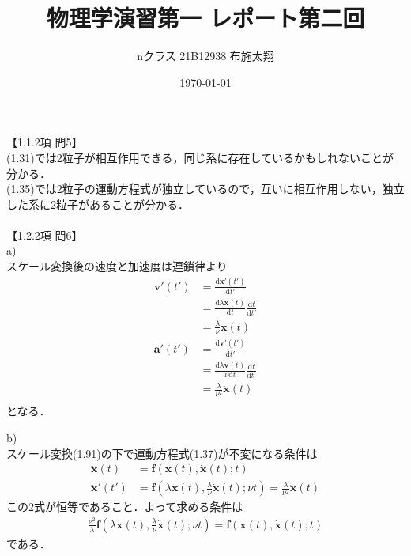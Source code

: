 \documentclass[a4paper,11pt]{jsarticle}
\begin{document}
\title{物理学演習第一 レポート第二回}
\author{nクラス 21B12938 布施太翔}
\date{\today}
\maketitle
\newpage

【1.1.2項 問5】 \\

(1.31)では2粒子が相互作用できる，同じ系に存在しているかもしれないことが分かる．\\
(1.35)では2粒子の運動方程式が独立しているので，互いに相互作用しない，独立した系に2粒子があることが分かる．\\
\\

【1.2.2項 問6】 \\

a) \\
スケール変換後の速度と加速度は連鎖律より
\begin{align*}
  \bm{v}'(t') &= \frac{\mathrm{d} \bm{x}'(t')}{\mathrm{d} t'} \\
  &= \frac{\mathrm{d} \lambda \bm{x}(t)}{\mathrm{d}t} \frac{\mathrm{d} t}{\mathrm{d} t'} \\
  &= \frac{\lambda}{\nu} \dot{\bm{x}}(t) \\
  \bm{a}'(t') &= \frac{\mathrm{d} \bm{v}'(t')}{\mathrm{d} t'} \\
  &= \frac{\mathrm{d} \lambda \bm{v}(t)}{\nu \mathrm{d}t} \frac{\mathrm{d} t}{\mathrm{d} t'} \\
  &= \frac{\lambda}{\nu^2} \ddot{\bm{x}}(t) \\
\end{align*}
となる．

b) \\
スケール変換(1.91)の下で運動方程式(1.37)が不変になる条件は
\begin{align*}
  \ddot{\bm{x}}(t) &= \bm{f}(\bm{x}(t), \dot{\bm{x}}(t); t) \\
  \ddot{\bm{x}}'(t') &= \bm{f}(\lambda \bm{x}(t), \frac{\lambda}{\nu} \dot{\bm{x}}(t); \nu t)
  = \frac{\lambda}{\nu^2} \ddot{\bm{x}}(t)
\end{align*}
この2式が恒等であること．よって求める条件は
\begin{align*}
  \frac{\nu^2}{\lambda} \bm{f}(\lambda \bm{x}(t), \frac{\lambda}{\nu} \dot{\bm{x}}(t); \nu t)
  = \bm{f}(\bm{x}(t), \dot{\bm{x}}(t); t)
\end{align*}
である．
\end{document}
